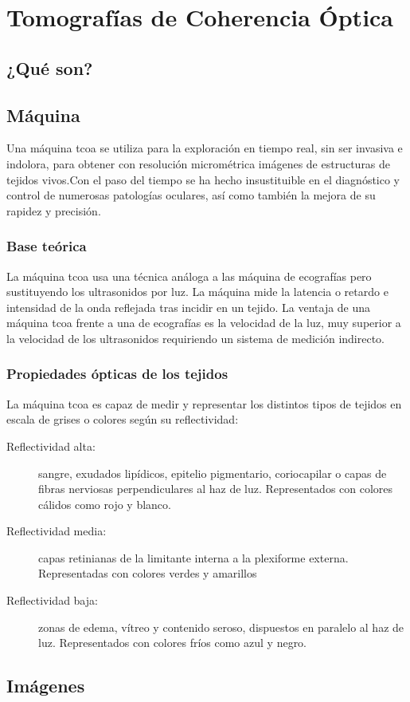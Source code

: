 \chapter{Tomografías de Coherencia Óptica}
\section{¿Qué son?}
\section{Máquina }
Una máquina \gls{tcoa} se utiliza para la exploración en tiempo real, sin ser
invasiva e indolora, para obtener con resolución micrométrica imágenes
de estructuras de tejidos vivos.Con el paso del tiempo se ha hecho
insustituible en el diagnóstico y control de numerosas patologías
oculares, así como también la mejora de su rapidez y precisión.
\subsection{Base teórica}
La máquina \gls{tcoa} usa una técnica análoga a las máquina de ecografías
pero sustituyendo los ultrasonidos por luz. La máquina mide la
latencia o retardo e intensidad de la onda reflejada tras incidir en
un tejido. La ventaja de una máquina \gls{tcoa} frente a una de ecografías es
la velocidad de la luz, muy superior a la velocidad de los
ultrasonidos requiriendo un sistema de medición indirecto.
\subsection{Propiedades ópticas de los tejidos}
La máquina \gls{tcoa} es capaz de medir y representar los distintos
tipos de tejidos en escala de grises o colores según su reflectividad:
\begin{description}
\item[Reflectividad alta:] sangre, exudados lipídicos, epitelio pigmentario,
coriocapilar o capas de fibras nerviosas perpendiculares al haz de
luz. Representados con colores cálidos como rojo y blanco.
\item[Reflectividad media:] capas retinianas de la limitante interna a la
plexiforme externa. Representadas con colores verdes y amarillos
\item[Reflectividad baja:] zonas de edema, vítreo y contenido seroso,
dispuestos en paralelo al haz de luz. Representados con colores fríos
como azul y negro.
\end{description}
\section{Imágenes }
